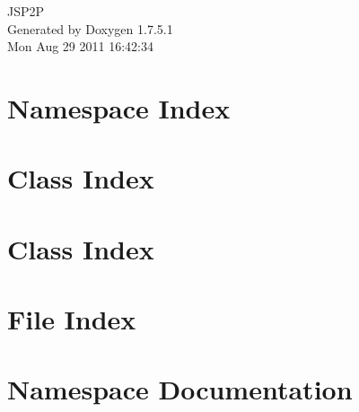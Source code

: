 \documentclass[a4paper]{book}
\begin{document}
\hypersetup{pageanchor=false,citecolor=blue}
\begin{titlepage}
\vspace*{7cm}
\begin{center}
{\Large \-J\-S\-P2\-P }\\
\vspace*{1cm}
{\large \-Generated by Doxygen 1.7.5.1}\\
\vspace*{0.5cm}
{\small Mon Aug 29 2011 16:42:34}\\
\end{center}
\end{titlepage}
\clearemptydoublepage
{}
\tableofcontents
\clearemptydoublepage
{}
\hypersetup{pageanchor=true,citecolor=blue}
\chapter{\-Namespace \-Index}

\chapter{\-Class \-Index}

\chapter{\-Class \-Index}

\chapter{\-File \-Index}

\chapter{\-Namespace \-Documentation}










\end{document}
